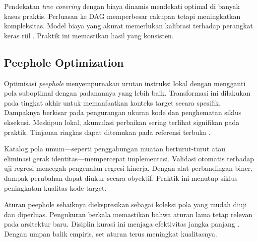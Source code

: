 \documentclass[../main.tex]{subfiles}
\begin{document}
Pendekatan \emph{tree covering} dengan biaya dinamis mendekati optimal di banyak kasus praktis. Perluasan ke DAG memperbesar cakupan tetapi meningkatkan kompleksitas. Model biaya yang akurat memerlukan kalibrasi terhadap perangkat keras riil \citep{WikiInstructionSelection}. Praktik ini memastikan hasil yang konsisten.

\subsection{Peephole Optimization}
Optimisasi \emph{peephole} menyempurnakan urutan instruksi lokal dengan mengganti pola suboptimal dengan padanannya yang lebih baik. Transformasi ini dilakukan pada tingkat akhir untuk memanfaatkan konteks target secara spesifik. Dampaknya berkisar pada pengurangan ukuran kode dan penghematan siklus eksekusi. Meskipun lokal, akumulasi perbaikan sering terlihat signifikan pada praktik. Tinjauan ringkas dapat ditemukan pada referensi terbuka \citep{WikiPeephole}.

Katalog pola umum—seperti penggabungan muatan berturut-turut atau eliminasi gerak identitas—mempercepat implementasi. Validasi otomatis terhadap uji regresi mencegah pengenalan regresi kinerja. Dengan alat perbandingan biner, dampak perubahan dapat diukur secara obyektif. Praktik ini menutup siklus peningkatan kualitas kode target.

\IfSubfilesClassLoaded{


}{}

Aturan peephole sebaiknya diekspresikan sebagai koleksi pola yang mudah diuji dan diperluas. Pengukuran berkala memastikan bahwa aturan lama tetap relevan pada arsitektur baru. Disiplin kurasi ini menjaga efektivitas jangka panjang \citep{WikiPeephole}. Dengan umpan balik empiris, set aturan terus meningkat kualitasnya.

\IfSubfilesClassLoaded{%


}{}
\end{document}
